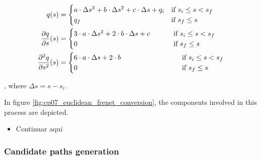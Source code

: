 \begin{equation}\label{eq:cp07_function_q}
\begin{align*}
q(s) &=
  \begin{cases}
   a \cdot \Delta s^3 + b \cdot \Delta s^2 + c \cdot \Delta s + q_i & \text{if } s_i \le s < s_f \\
   q_f        & \text{if } s_f \le s
  \end{cases}\\
{{\partial q} \over {\partial s}}(s) &=
  \begin{cases}
   3 \cdot a \cdot \Delta s^2 + 2 \cdot b \cdot \Delta s + c & ~~~~~~~\text{if } s_i \le s < s_f \\
   0        & ~~~~~~~\text{if } s_f \le s
  \end{cases}\\
{{\partial^2 q} \over {\partial s^2}}(s) &=
  \begin{cases}
   6 \cdot a \cdot \Delta s + 2 \cdot b & ~~~~~~~~~~~~~~~~~~~~~~~\text{if } s_i \le s < s_f \\
   0        & ~~~~~~~~~~~~~~~~~~~~~~~\text{if } s_f \le s
  \end{cases}
\end{align*}
\end{equation}

, where $\Delta s = s - s_i$.

In figure \ref{fig:cp07_euclidean_frenet_conversion}, the components involved in this process are depicted.
\begin{itemize}
 \item Continuar aqui
\end{itemize}


\subsubsection{Candidate paths generation}\label{ch:chapter07_01_03_02}

% 
% 
% 

